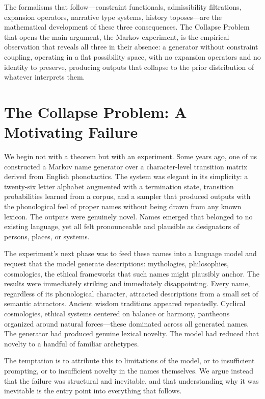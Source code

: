 \documentclass[12pt, a4paper]{article}
\theoremstyle{plain}
\theoremstyle{definition}
\theoremstyle{remark}
\begin{document}
The formalisms that follow---constraint functionals, admissibility filtrations, expansion operators, narrative type systems, history toposes---are the mathematical development of these three consequences. The Collapse Problem that opens the main argument, the Markov experiment, is the empirical observation that reveals all three in their absence: a generator without constraint coupling, operating in a flat possibility space, with no expansion operators and no identity to preserve, producing outputs that collapse to the prior distribution of whatever interprets them.

\section{The Collapse Problem: A Motivating Failure}

We begin not with a theorem but with an experiment. Some years ago, one of us constructed a Markov name generator over a character-level transition matrix derived from English phonotactics. The system was elegant in its simplicity: a twenty-six letter alphabet augmented with a termination state, transition probabilities learned from a corpus, and a sampler that produced outputs with the phonological feel of proper names without being drawn from any known lexicon. The outputs were genuinely novel. Names emerged that belonged to no existing language, yet all felt pronounceable and plausible as designators of persons, places, or systems.

The experiment's next phase was to feed these names into a language model and request that the model generate descriptions: mythologies, philosophies, cosmologies, the ethical frameworks that such names might plausibly anchor. The results were immediately striking and immediately disappointing. Every name, regardless of its phonological character, attracted descriptions from a small set of semantic attractors. Ancient wisdom traditions appeared repeatedly. Cyclical cosmologies, ethical systems centered on balance or harmony, pantheons organized around natural forces---these dominated across all generated names. The generator had produced genuine lexical novelty. The model had reduced that novelty to a handful of familiar archetypes.

The temptation is to attribute this to limitations of the model, or to insufficient prompting, or to insufficient novelty in the names themselves. We argue instead that the failure was structural and inevitable, and that understanding why it was inevitable is the entry point into everything that follows.
\end{document}
